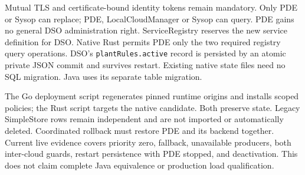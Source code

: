 \documentclass[a4paper]{arrowhead}
\begin{document}
\par\medskip
Mutual TLS and certificate-bound identity tokens remain mandatory. Only PDE or Sysop can replace; PDE, LocalCloudManager or Sysop can query. PDE gains no general DSO administration right. ServiceRegistry reserves the new service definition for DSO. Native Rust permits PDE only the two required registry query operations. DSO's \texttt{plantRules.active} record is persisted by an atomic private JSON commit and survives restart. Existing native state files need no SQL migration. Java uses its separate table migration.
\par\medskip
The Go deployment script regenerates pinned runtime origins and installs scoped policies; the Rust script targets the native candidate. Both preserve state. Legacy SimpleStore rows remain independent and are not imported or automatically deleted. Coordinated rollback must restore PDE and its backend together. Current live evidence covers priority zero, fallback, unavailable producers, both inter-cloud guards, restart persistence with PDE stopped, and deactivation. This does not claim complete Java equivalence or production load qualification.
\end{document}
